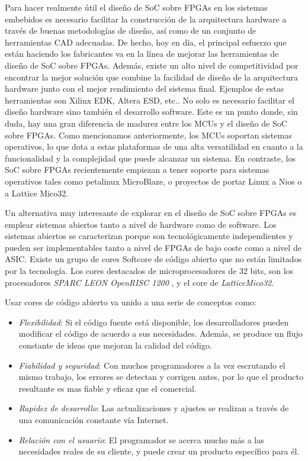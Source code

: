 Para hacer realmente útil el diseño de SoC sobre FPGAs en los sistemas embebidos es necesario facilitar la construcción de la arquitectura hardware a
través de buenas metodologías de diseño, así como de un conjunto de herramientas CAD adecuadas. De hecho, hoy en día, el principal esfuerzo que están
haciendo los fabricantes va en la línea de mejorar las herramientas de diseño de SoC sobre FPGAs. Además, existe un alto nivel de competitividad por
encontrar la mejor solución que combine la facilidad de diseño de la arquitectura hardware junto con el mejor rendimiento del sistema final. Ejemplos
de estas herramientas son Xilinx EDK, Altera ESD, etc.. No solo es necesario facilitar el diseño hardware sino también el desarrollo software. Este
es un punto donde, sin duda, hay una gran diferencia de madurez entre los MCUs y el diseño de SoC sobre FPGAs. Como mencionamos anteriormente, los
MCUs soportan sistemas operativos, lo que dota a estas plataformas de una alta versatilidad en cuanto a la funcionalidad y la complejidad que puede
alcanzar un sistema. En contraste, los SoC sobre FPGAs recientemente empiezan a tener soporte para sistemas operativos tales como petalinux
MicroBlaze, o proyectos de portar Linux a Nios o a Lattice Mico32.

Un alternativa muy interesante de explorar en el diseño de SoC sobre FPGAs es emplear sistemas abiertos tanto  a nivel de hardware como de software.
Los sistemas abiertos se caracterizan porque son tecnológicamente independientes y pueden ser implementables tanto a nivel de FPGAs de bajo coste
como a nivel de ASIC. Existe un grupo de cores Softcore de código abierto que no están limitados por la tecnología. Los cores destacados de
microprocesadores de 32 bits, son los procesadores \textit{SPARC LEON OpenRISC 1200} , y el core de \textit{LatticeMico32}. 

Usar cores de código abierto va unido a una serie de conceptos como:
\begin {itemize}
	\item \textit{Flexibilidad}: Si el código fuente está disponible, los desarrolladores pueden modificar el código de acuerdo a sus necesidades.
	Además, se produce un flujo constante de ideas que mejoran la calidad del código.
	\item \textit{Fiabilidad y seguridad}: Con muchos programadores a la vez escrutando el mismo trabajo, los errores se detectan y corrigen antes, por lo que
	el producto resultante es mas fiable y eficaz que el comercial.
	\item \textit{Rapidez de desarrollo}: Las actualizaciones y ajustes se realizan a través de una comunicación constante vía Internet.
	\item \textit{Relación con el usuario}: El programador se acerca mucho más a las necesidades reales de su cliente, y puede crear un producto
	específico para él.
 \end {itemize}

